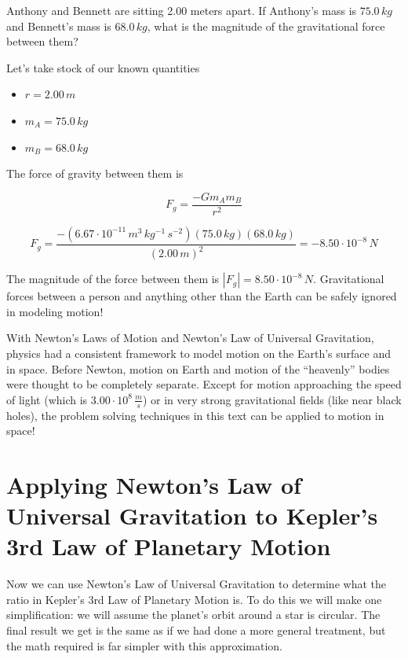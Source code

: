 \documentclass[12pt]{book}
\begin{document}
\begin{exampleblock}

Anthony and Bennett are sitting 2.00 meters apart. If Anthony's mass is $75.0 \, kg$ and Bennett's mass is $68.0 \, kg$, what is the magnitude of the gravitational force between them?

\hspace{10pt}

Let's take stock of our known quantities

\begin{itemize}
\item $r = 2.00 \, m$
\item $m_A = 75.0 \, kg$
\item $m_B = 68.0 \, kg$
\end{itemize}

The force of gravity between them is

\begin{equation}
F_g = \frac{-G m_A m_B}{r^2}
\end{equation}

\begin{equation}
F_g = \frac{-(6.67 \cdot 10^{-11} \, m^3 \, kg^{-1} \, s^{-2}) (75.0 \, kg) (68.0 \, kg)}{(2.00 \, m)^2} = -8.50 \cdot 10^{-8} \, N
\end{equation}

The magnitude of the force between them is $|F_g| = 8.50 \cdot 10^{-8} \, N$. Gravitational forces between a person and anything other than the Earth can be safely ignored in modeling motion!
\end{exampleblock}

With Newton's Laws of Motion and Newton's Law of Universal Gravitation, physics had a consistent framework to model motion on the Earth's surface and in space. Before Newton, motion on Earth and motion of the ``heavenly'' bodies were thought to be completely separate. Except for motion approaching the speed of light (which is $3.00 \cdot 10^8 \, \frac{m}{s}$) or in very strong gravitational fields (like near black holes), the problem solving techniques in this text can be applied to motion in space!

\section{Applying Newton's Law of Universal Gravitation to Kepler's 3rd Law of Planetary Motion}

Now we can use Newton's Law of Universal Gravitation to determine what the ratio in Kepler's 3rd Law of Planetary Motion is. To do this we will make one simplification: we will assume the planet's orbit around a star is circular. The final result we get is the same as if we had done a more general treatment, but the math required is far simpler with this approximation.
\end{document}
